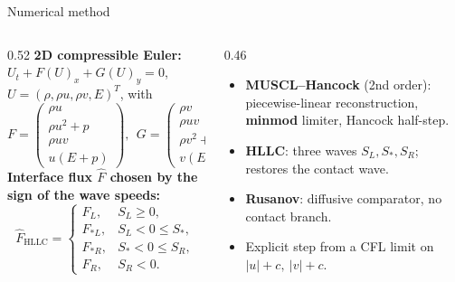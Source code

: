 \documentclass[xcolor=table]{beamer}
\begin{document}
\begin{frame}{Numerical method}
\begin{columns}[T]
\begin{column}{0.52\textwidth}
\textbf{2D compressible Euler:} $U_t+F(U)_x+G(U)_y=0$,
$U=(\rho,\rho u,\rho v,E)^T$, with
{\scriptsize
\begin{equation*}
  F=\begin{pmatrix}\rho u\\ \rho u^2{+}p\\ \rho uv\\ u(E{+}p)\end{pmatrix},\ \
  G=\begin{pmatrix}\rho v\\ \rho uv\\ \rho v^2{+}p\\ v(E{+}p)\end{pmatrix}.
\end{equation*}}
\textbf{Interface flux $\widehat F$ chosen by the sign of the wave speeds:}
{\scriptsize
\begin{equation*}
  \widehat F_{\mathrm{HLLC}}=
  \begin{cases}
   F_L, & S_L\ge 0,\\
   F_{\ast L}, & S_L<0\le S_\ast,\\
   F_{\ast R}, & S_\ast<0\le S_R,\\
   F_R, & S_R<0.
  \end{cases}
\end{equation*}}
\end{column}
\begin{column}{0.46\textwidth}
\begin{itemize}
\item \textbf{MUSCL--Hancock} (2nd order): piecewise-linear reconstruction,
      \textbf{minmod} limiter, Hancock half-step.
\item \textbf{HLLC}: three waves $S_L,S_\ast,S_R$; restores the contact wave.
\item \textbf{Rusanov}: diffusive comparator, no contact branch.
\item Explicit step from a CFL limit on $|u|+c,\ |v|+c$.
\end{itemize}
\end{column}
\end{columns}
\end{frame}
\end{document}
